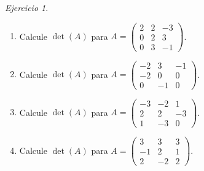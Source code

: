 \documentclass[12pt]{article}
\theoremstyle{remark}
\newtheorem{Ejer}[definicion]{Ejercicio}
\begin{document}
\begin{Ejer}
\begin{enumerate}[resume=banco]
\item Calcule $\det(A)$ para $A=\begin{pmatrix}2&2&-3\\0&2&3\\0&3&-1\end{pmatrix}$.

\item Calcule $\det(A)$ para $A=\begin{pmatrix}-2&3&-1\\-2&0&0\\0&-1&0\end{pmatrix}$.

\item Calcule $\det(A)$ para $A=\begin{pmatrix}-3&-2&1\\2&2&-3\\1&-3&0\end{pmatrix}$.

\item Calcule $\det(A)$ para $A=\begin{pmatrix}3&3&3\\-1&2&1\\2&-2&2\end{pmatrix}$.

\end{enumerate}
\end{Ejer}
\end{document}

